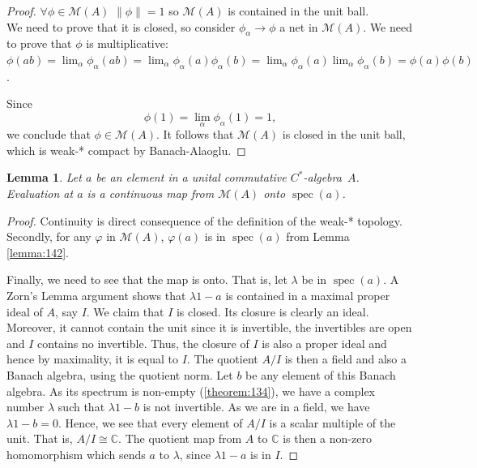 \documentclass{book}
\newtheorem{lemma}[definition]{Lemma}
\def\cstar{\(C^*\)-algebra}
\begin{document}
\begin{proof}  
  \(\forall\phi\in\mathcal{M}(A)\) \(\|\phi\|=1\) so \(\mathcal{M}(A)\) is contained in the unit ball.\\
  We need to prove that it is closed, so consider \(\phi_\alpha\rightarrow\phi\) a net in \(\mathcal{M}(A)\). We need to prove that \(\phi\) is multiplicative:\\
  \(\phi(ab)=\lim_{\alpha}\phi_\alpha(ab)=\lim_{\alpha}\phi_\alpha(a)\phi_\alpha(b)=\lim_{\alpha}\phi_\alpha(a)\lim_{\alpha}\phi_\alpha(b)=\phi(a)\phi(b)\).\par
  Since
  \[
    \phi(1)=\lim_\alpha \phi_\alpha(1)=1,
  \]
  we conclude that \(\phi\in\mathcal{M}(A)\). It follows that \(\mathcal{M}(A)\) is closed in the unit ball,
  which is weak-* compact by Banach-Alaoglu.
\end{proof}
\begin{lemma}\label{lemma:144}
  Let \(a\) be an element in a unital commutative \cstar\ \(A\).
  Evaluation at \(a\) is a continuous map from \(\mathcal{M}(A)\) onto \(\operatorname{spec}(a)\).
\end{lemma}
\begin{proof}
  Continuity is direct consequence of the definition of the weak-* 
  topology. Secondly, for any \(\varphi\) in \(\mathcal{M}(A)\), \(\varphi(a)\) is in \(\operatorname{spec}(a)\) from Lemma \ref{lemma:142}.\par
  Finally, we need to see that the map is onto. That is, let \(\lambda\) be in \(\operatorname{spec}(a)\). A
  Zorn's Lemma argument shows that \(\lambda1-a\) is contained in a maximal
  proper ideal of \(A\), say \(I\). We claim that \(I\) is closed. Its closure is clearly
  an ideal. Moreover, it cannot contain the unit since it is invertible, the
  invertibles are open and \(I\) contains no invertible. Thus, the closure of \(I\) is
  also a proper ideal and hence by maximality, it is equal to \(I\). The quotient
  \(A/I\) is then a field and also a Banach algebra, using the quotient norm. Let \(b\)
  be any element of this Banach algebra. As its spectrum is non-empty (\ref{theorem:134}),
  we have a complex number \(\lambda\) such that \(\lambda1 - b\) is not invertible. As we are
  in a field, we have \(\lambda1-b = 0\). Hence, we see that every element of \(A/I\) is a
  scalar multiple of the unit. That is, \(A/I \cong \mathbb C\). The quotient map from \(A\) to
  \(\mathbb{C}\) is then a non-zero homomorphism which sends \(a\) to \(\lambda\), since \(\lambda1 - a\) is in
  \(I\).  
\end{proof}
\end{document}
